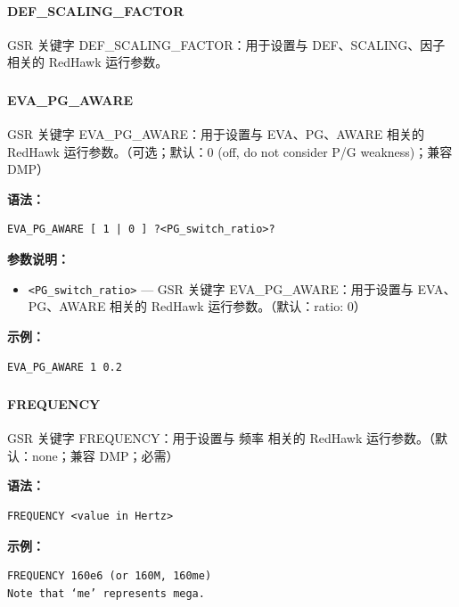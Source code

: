 \paragraph*{DEF_SCALING_FACTOR}

GSR 关键字 DEF_SCALING_FACTOR：用于设置与 DEF、SCALING、因子 相关的 RedHawk 运行参数。

\subsubsection{}
\paragraph*{EVA_PG_AWARE}

GSR 关键字 EVA_PG_AWARE：用于设置与 EVA、PG、AWARE 相关的 RedHawk 运行参数。（可选；默认：0 (off, do not consider P/G weakness)；兼容 DMP）

\textbf{语法：}
\begin{lstlisting}
EVA_PG_AWARE [ 1 | 0 ] ?<PG_switch_ratio>?
\end{lstlisting}

\textbf{参数说明：}
\begin{itemize}
\item \texttt{<PG\_switch\_ratio>} — GSR 关键字 EVA\_PG\_AWARE：用于设置与 EVA、PG、AWARE 相关的 RedHawk 运行参数。（默认：ratio: 0）
\end{itemize}

\textbf{示例：}
\begin{lstlisting}
EVA_PG_AWARE 1 0.2
\end{lstlisting}

\subsubsection{}
\paragraph*{FREQUENCY}

GSR 关键字 FREQUENCY：用于设置与 频率 相关的 RedHawk 运行参数。（默认：none；兼容 DMP；必需）

\textbf{语法：}
\begin{lstlisting}
FREQUENCY <value in Hertz>
\end{lstlisting}

\textbf{示例：}
\begin{lstlisting}
FREQUENCY 160e6 (or 160M, 160me)
Note that ‘me’ represents mega.
\end{lstlisting}

